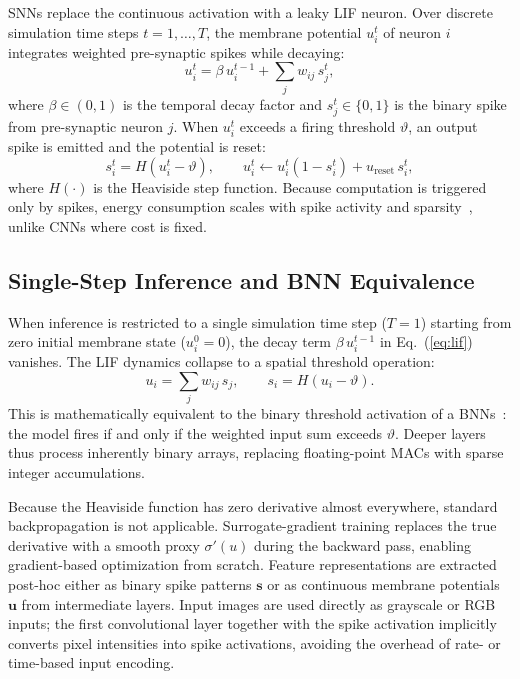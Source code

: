 \documentclass{ieeeaccess}
\begin{document}
SNNs replace the continuous activation with a leaky LIF neuron. Over discrete simulation time steps $t = 1, \ldots, T$, the membrane potential $u_i^t$ of neuron $i$ integrates weighted pre-synaptic spikes while decaying:
\begin{equation}
\label{eq:lif}
u_i^t = \beta\, u_i^{t-1} + \sum_{j} w_{ij}\, s_j^t,
\end{equation}
where $\beta \in (0,1)$ is the temporal decay factor and $s_j^t \in \{0,1\}$ is the binary spike from pre-synaptic neuron $j$. When $u_i^t$ exceeds a firing threshold $\vartheta$, an output spike is emitted and the potential is reset:
\begin{equation}
\label{eq:spike}
s_i^t = H\!\left(u_i^t - \vartheta\right), \qquad u_i^t \leftarrow u_i^t(1 - s_i^t) + u_{\text{reset}}\,s_i^t,
\end{equation}
where $H(\cdot)$ is the Heaviside step function. Because computation is triggered only by spikes, energy consumption scales with spike activity and sparsity~\cite{2021-eshraghian}, unlike CNNs where cost is fixed.

\subsection{Single-Step Inference and BNN Equivalence}

When inference is restricted to a single simulation time step ($T=1$) starting from zero initial membrane state ($u_i^0 = 0$), the decay term $\beta\, u_i^{t-1}$ in Eq.~(\ref{eq:lif}) vanishes. The LIF dynamics collapse to a spatial threshold operation:
\begin{equation}
\label{eq:t1}
u_i = \sum_{j} w_{ij}\, s_j, \qquad s_i = H\!\left(u_i - \vartheta\right).
\end{equation}
This is mathematically equivalent to the binary threshold activation of a BNNs~\cite{courbariaux2016binarized}: the model fires if and only if the weighted input sum exceeds $\vartheta$. Deeper layers thus process inherently binary arrays, replacing floating-point MACs with sparse integer accumulations.

Because the Heaviside function has zero derivative almost everywhere, standard backpropagation is not applicable. Surrogate-gradient training replaces the true derivative with a smooth proxy $\sigma'(u)$ during the backward pass, enabling gradient-based optimization from scratch. Feature representations are extracted post-hoc either as binary spike patterns $\mathbf{s}$ or as continuous membrane potentials $\mathbf{u}$ from intermediate layers. Input images are used directly as grayscale or RGB inputs; the first convolutional layer together with the spike activation implicitly converts pixel intensities into spike activations, avoiding the overhead of rate- or time-based input encoding.
\end{document}
